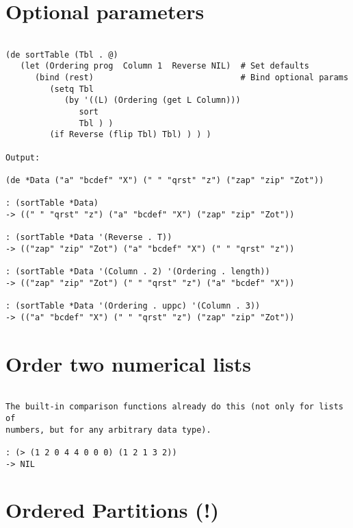 \section*{Optional parameters}

\begin{verbatim}

(de sortTable (Tbl . @)
   (let (Ordering prog  Column 1  Reverse NIL)  # Set defaults
      (bind (rest)                              # Bind optional params
         (setq Tbl
            (by '((L) (Ordering (get L Column)))
               sort
               Tbl ) )
         (if Reverse (flip Tbl) Tbl) ) ) )

Output:

(de *Data ("a" "bcdef" "X") (" " "qrst" "z") ("zap" "zip" "Zot"))

: (sortTable *Data)
-> ((" " "qrst" "z") ("a" "bcdef" "X") ("zap" "zip" "Zot"))

: (sortTable *Data '(Reverse . T))
-> (("zap" "zip" "Zot") ("a" "bcdef" "X") (" " "qrst" "z"))

: (sortTable *Data '(Column . 2) '(Ordering . length))
-> (("zap" "zip" "Zot") (" " "qrst" "z") ("a" "bcdef" "X"))

: (sortTable *Data '(Ordering . uppc) '(Column . 3))
-> (("a" "bcdef" "X") (" " "qrst" "z") ("zap" "zip" "Zot"))

\end{verbatim}

\section*{Order two numerical lists}

\begin{verbatim}

The built-in comparison functions already do this (not only for lists of
numbers, but for any arbitrary data type).

: (> (1 2 0 4 4 0 0 0) (1 2 1 3 2))
-> NIL

\end{verbatim}

\section*{Ordered Partitions (!)}

